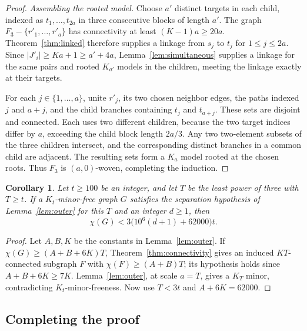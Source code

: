 \documentclass[11pt]{article}
\newtheorem{corollary}[theorem]{Corollary}
\begin{document}
\begin{proof}
\medskip\noindent\emph{Assembling the rooted model.}
Choose $a'$ distinct targets in each child, indexed as
$t_1,\ldots,t_{2a}$ in three consecutive blocks of length $a'$.
The graph $F_3-\{r'_1,\ldots,r'_a\}$ has connectivity at least
$(K-1)a\ge20a$. Theorem~\ref{thm:linked} therefore supplies a
linkage from $s_j$ to $t_j$ for $1\le j\le2a$.
Since $|J'_i|\ge Ka+1\ge a'+4a$, Lemma~\ref{lem:simultaneous}
supplies a linkage for the same pairs and rooted $K_{a'}$ models
in the children, meeting the linkage exactly at their targets.

For each $j\in\{1,\ldots,a\}$, unite $r'_j$, its two chosen
neighbor edges, the paths indexed $j$ and $a+j$, and the child
branches containing $t_j$ and $t_{a+j}$. These sets are disjoint
and connected. Each uses two different children, because the two
target indices differ by $a$, exceeding the child block length $2a/3$.
Any two two-element subsets of the three children intersect, and
the corresponding distinct branches in a common child are adjacent.
The resulting sets form a $K_a$ model rooted at the chosen roots.
Thus $F_3$ is $(a,0)$-woven, completing the induction.
\end{proof}

\begin{corollary}\label{cor:outer}
Let $t\ge100$ be an integer, and let $T$ be the least power of three
with $T\ge t$. If a $K_t$-minor-free graph $G$ satisfies the
separation hypothesis of Lemma~\ref{lem:outer} for this $T$ and an
integer $d\ge1$, then
\[
 \chi(G)<3\bigl(10^6(d+1)+62000\bigr)t.
\]
\end{corollary}
\begin{proof}
Let $A,B,K$ be the constants in Lemma~\ref{lem:outer}. If
$\chi(G)\ge(A+B+6K)T$, Theorem~\ref{thm:connectivity} gives an
induced $KT$-connected subgraph $F$ with $\chi(F)\ge(A+B)T$;
its hypothesis holds since $A+B+6K\ge7K$.
Lemma~\ref{lem:outer}, at scale $a=T$, gives a $K_T$ minor,
contradicting $K_t$-minor-freeness. Now use $T<3t$ and $A+6K=62000$.
\end{proof}
\subsection{Completing the proof}
\end{document}
